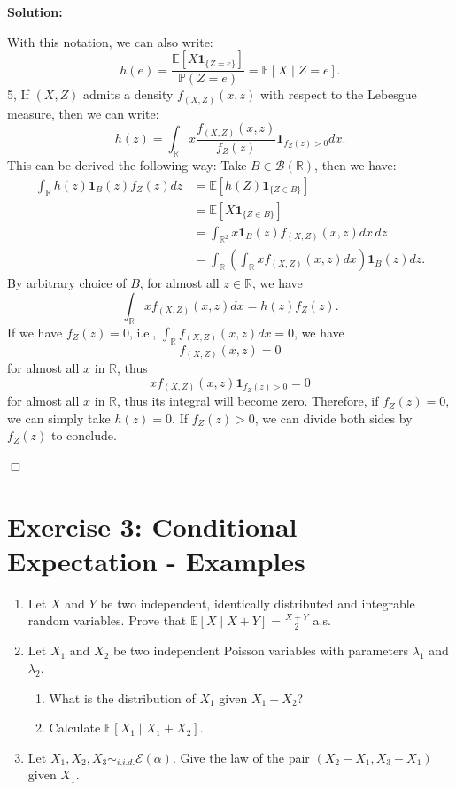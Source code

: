 \documentclass[12pt]{article}
\newenvironment{solution}{\vspace{0.2cm}\color{blue}\textbf{Solution:}}{\hfill\ensuremath{\Box}}
\begin{document}
\begin{solution}
   
    
    With this notation, we can also write:
    \[h(e)  = \frac{\mathbb{E}[X \mathbf{1}_{\{Z = e\}}]}{\mathbb{P}(Z = e)}= \mathbb{E}[X \mid Z = e].\]
5,
    If $(X, Z)$ admits a density $f_{(X,Z)}(x, z)$ with respect to the Lebesgue measure, then we can write:
    \[h(z) = \int_{\mathbb{R}} x \frac{f_{(X,Z)}(x, z)}{f_{Z}(z)}\mathbf{1}_{f_{Z}(z)>0} dx.\]
    This can be derived the following way:
    Take $B \in \mathcal{B}(\mathbb{R})$, then we have:
    \begin{align*}
        \int_{\mathbb{R}} h(z)\mathbf{1}_{B}(z)f_{Z}(z) dz 
        &= \mathbb{E}[h(Z)\mathbf{1}_{\{Z \in B\}}] \\
        &= \mathbb{E}[X \mathbf{1}_{\{Z \in B\}}] \\
        &= \int_{\mathbb{R}^2} x \mathbf{1}_{B}(z) f_{(X,Z)}(x, z) dx\,dz \\
        &= \int_{\mathbb{R}} \left( \int_{\mathbb{R}} x f_{(X,Z)}(x, z) dx \right) \mathbf{1}_{B}(z) dz.
    \end{align*}
    By arbitrary choice of $B$, for almost all $z\in \mathbb{R}$, we have \[\int_{\mathbb{R}} x f_{(X,Z)}(x, z) dx = h(z)f_{Z}(z).\] 
    If we have $f_{Z}(z)=0$, i.e., $\int_{\mathbb{R}} f_{(X,Z)}(x, z) dx = 0$, we have \[f_{(X,Z)}(x, z)=0\] for almost all $x$ in $\mathbb{R}$, thus \[x f_{(X,Z)}(x, z) \mathbf{1}_{f_{Z}(z)>0}=0\] for almost all $x$ in $\mathbb{R}$, thus its integral will become zero. Therefore, if $f_{Z}(z) = 0$,  we can simply take $h(z)=0$. If $f_{Z}(z) > 0$, we can divide both sides by $f_{Z}(z)$ to conclude.

\end{solution}

\section*{Exercise 3: Conditional Expectation - Examples}
\begin{enumerate}
    \item Let $X$ and $Y$ be two independent, identically distributed and integrable random variables. Prove that $\mathbb{E}[X \mid X + Y] = \frac{X+Y}{2}$ a.s.
    \item Let $X_1$ and $X_2$ be two independent Poisson variables with parameters $\lambda_1$ and $\lambda_2$.
    \begin{enumerate}
        \item What is the distribution of $X_1$ given $X_1 + X_2$?
        \item Calculate $\mathbb{E}[X_1 \mid X_1 + X_2]$.
    \end{enumerate}
    \item Let $X_1, X_2, X_3 \sim_{i.i.d.} \mathcal{E}(\alpha)$. Give the law of the pair $(X_2 - X_1, X_3 - X_1)$ given $X_1$.
\end{enumerate}
\end{document}
